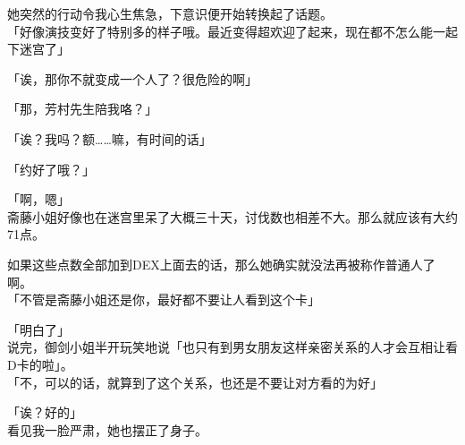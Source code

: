 她突然的行动令我心生焦急，下意识便开始转换起了话题。\\

「好像演技变好了特别多的样子哦。最近变得超欢迎了起来，现在都不怎么能一起下迷宫了」

「诶，那你不就变成一个人了？很危险的啊」

「那，芳村先生陪我咯？」

「诶？我吗？额……嘛，有时间的话」

「约好了哦？」

「啊，嗯」\\

斋藤小姐好像也在迷宫里呆了大概三十天，讨伐数也相差不大。那么就应该有大约71点。

如果这些点数全部加到DEX上面去的话，那么她确实就没法再被称作普通人了啊。\\

「不管是斋藤小姐还是你，最好都不要让人看到这个卡」

「明白了」\\

说完，御剑小姐半开玩笑地说「也只有到男女朋友这样亲密关系的人才会互相让看D卡的啦」。\\

「不，可以的话，就算到了这个关系，也还是不要让对方看的为好」

「诶？好的」\\

看见我一脸严肃，她也摆正了身子。\\

